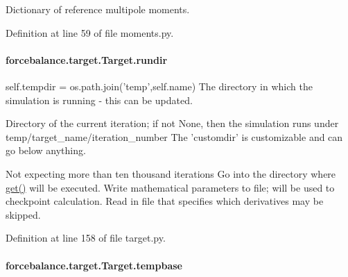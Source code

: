 Dictionary of reference multipole moments. 



Definition at line 59 of file moments.\-py.

\hypertarget{classforcebalance_1_1target_1_1Target_a6872de5b2d4273b82336ea5b0da29c9e}{
\paragraph[{rundir}]{\setlength{\rightskip}{0pt plus 5cm}forcebalance.\-target.\-Target.\-rundir\hspace{0.3cm}{\ttfamily [inherited]}}}\label{classforcebalance_1_1target_1_1Target_a6872de5b2d4273b82336ea5b0da29c9e}


self.\-tempdir = os.\-path.\-join('temp',self.\-name) The directory in which the simulation is running -\/ this can be updated. 

Directory of the current iteration; if not None, then the simulation runs under temp/target\-\_\-name/iteration\-\_\-number The 'customdir' is customizable and can go below anything.

Not expecting more than ten thousand iterations Go into the directory where \hyperlink{classforcebalance_1_1target_1_1Target_a1389888302c49d529716cb45b13a6f5a}{get()} will be executed. Write mathematical parameters to file; will be used to checkpoint calculation. Read in file that specifies which derivatives may be skipped. 

Definition at line 158 of file target.\-py.

\hypertarget{classforcebalance_1_1target_1_1Target_ae5b544d3e11365865813ef3d626ef81d}{
\paragraph[{tempbase}]{\setlength{\rightskip}{0pt plus 5cm}forcebalance.\-target.\-Target.\-tempbase\hspace{0.3cm}{\ttfamily [inherited]}}}\label{classforcebalance_1_1target_1_1Target_ae5b544d3e11365865813ef3d626ef81d}


